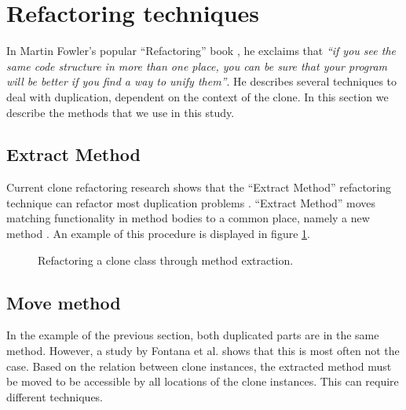 \section{Refactoring techniques}
In Martin Fowler's popular ``Refactoring'' book \cite{fowler2018refactoring}, he exclaims that \textit{``if you see the same code structure in more than one place, you can be sure that your program will be better if you find a way to unify them''}. He describes several techniques to deal with duplication, dependent on the context of the clone. In this section we describe the methods that we use in this study.

\subsection{Extract Method}
Current clone refactoring research shows that the ``Extract Method'' refactoring technique can refactor most duplication problems \cite{fontana2015duplicated, tsantalis2015assessing, white2016deep}. ``Extract Method'' moves matching functionality in method bodies to a common place, namely a new method \cite{fowler2018refactoring}. An example of this procedure is displayed in figure \ref{fig:extractmethod}.

\begin{figure}[H]
\begin{parcolumns}{2}
\end{parcolumns}
\caption{Refactoring a clone class through method extraction.}
\label{fig:extractmethod}
\end{figure}

\subsection{Move method}
In the example of the previous section, both duplicated parts are in the same method. However, a study by Fontana et al. \cite{fontana2015duplicated} shows that this is most often not the case. Based on the relation between clone instances, the extracted method must be moved to be accessible by all locations of the clone instances. This can require different techniques.


